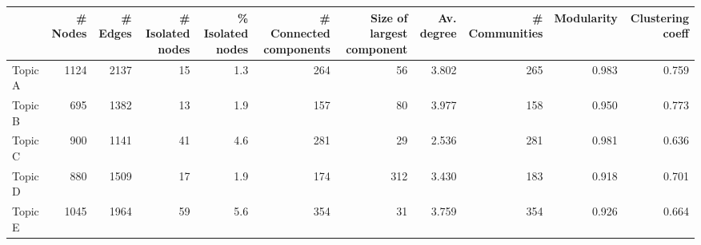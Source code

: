 \begin{tabular}{lrrrrrrrrrr}
\toprule
{} &  \# Nodes &  \# Edges &  \# Isolated nodes &  \% Isolated nodes &  \# Connected components &  Size of largest component &  Av. degree &  \# Communities &  Modularity &  Clustering coeff \\
\midrule
Topic A &     1124 &     2137 &                15 &               1.3 &                     264 &                         56 &       3.802 &            265 &       0.983 &             0.759 \\
Topic B &      695 &     1382 &                13 &               1.9 &                     157 &                         80 &       3.977 &            158 &       0.950 &             0.773 \\
Topic C &      900 &     1141 &                41 &               4.6 &                     281 &                         29 &       2.536 &            281 &       0.981 &             0.636 \\
Topic D &      880 &     1509 &                17 &               1.9 &                     174 &                        312 &       3.430 &            183 &       0.918 &             0.701 \\
Topic E &     1045 &     1964 &                59 &               5.6 &                     354 &                         31 &       3.759 &            354 &       0.926 &             0.664 \\
\bottomrule
\end{tabular}
